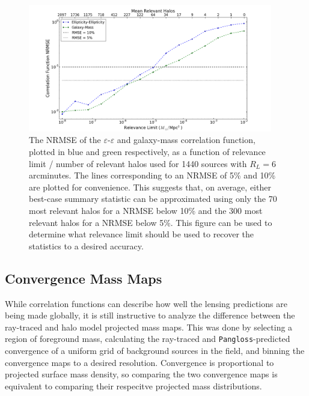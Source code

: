 \documentclass[%
 reprint,
 amsmath,amssymb,
 aps,nofootinbib
]{revtex4-1}
\begin{document}
\begin{figure}
    \centering
    \includegraphics[width=0.95\textwidth]{figs-swe/thesis/halo_fraction_long.png}
    \captionsetup{justification=raggedright,singlelinecheck=false}
    \caption{The NRMSE of the $\varepsilon$-$\varepsilon$ and galaxy-mass correlation function, plotted in blue and green respectively, as a function of relevance limit / number of relevant halos used for 1440 sources with $R_L=6$ arcminutes. The lines corresponding to an NRMSE of 5\% and 10\% are plotted for convenience. This suggests that, on average, either best-case summary statistic can be approximated using only the 70 most relevant halos for a NRMSE below 10\% and the 300 most relevant halos for a NRMSE below 5\%. This figure can be used to determine what relevance limit should be used to recover the statistics to a desired accuracy.}
    \label{fig:halo_fraction}
\end{figure}



\subsection{Convergence Mass Maps} \label{mass_maps}

While correlation functions can describe how well the lensing predictions are being made globally, it is still instructive to analyze the difference between the ray-traced and halo model projected mass maps. This was done by selecting a region of foreground mass, calculating the ray-traced and \texttt{Pangloss}-predicted convergence of a uniform grid of background sources in the field, and binning the convergence maps to a desired resolution. Convergence is proportional to projected surface mass density, so comparing the two convergence maps is equivalent to comparing their respecitve projected mass distributions.
\end{document}

